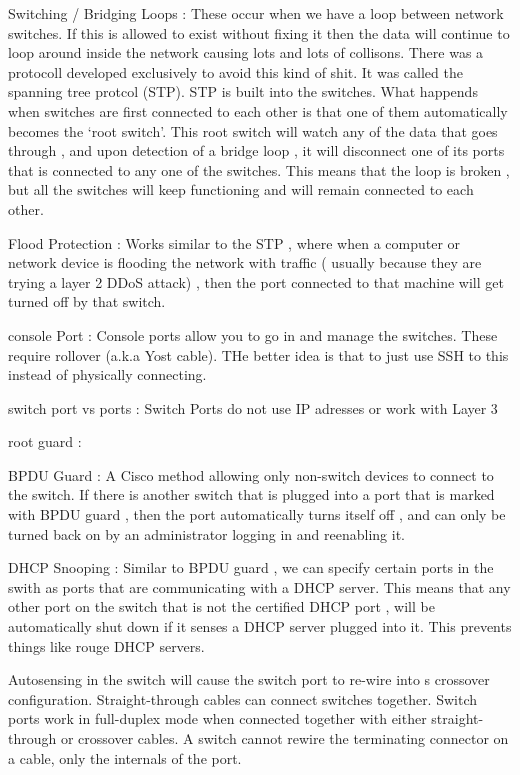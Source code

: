 Switching / Bridging Loops : These occur when we have a loop between network switches.
If this is allowed to exist without fixing it then the data will continue to
loop around inside the network causing lots and lots of collisons. There was a
protocoll developed exclusively to avoid this kind of shit. It was called the
spanning tree protcol (STP). STP is built into the switches. What happends
when switches are first connected to each other is that one of them
automatically becomes the `root switch'. This root switch will watch any of the
data that goes through , and upon detection of a bridge loop , it will
disconnect one of its ports that is connected to any one of the switches. This
means that the loop is broken , but all the switches will keep functioning and
will remain connected to each other.

Flood Protection : Works similar to the STP , where when a computer or network
device is flooding the network with traffic ( usually because they are trying a
layer 2 DDoS attack) , then the port connected to that machine will get turned
off by that switch.

console Port : Console ports allow you to go in and manage the switches. These
require rollover (a.k.a Yost cable). THe better idea is that to just use SSH to
this instead of physically connecting.

switch port vs ports : Switch Ports do not use IP adresses or work with Layer 3

root guard :

BPDU Guard : A Cisco method allowing only non-switch devices to connect to the
switch. If there is another switch that is plugged into a port that is marked
with BPDU guard , then the port automatically turns itself off , and can only be
turned back on by an administrator logging in and reenabling it.


DHCP Snooping : Similar to BPDU guard , we can specify certain ports in the
swith as ports that are communicating with a DHCP server. This means that any
other port on the switch that is not the certified DHCP port , will be
automatically shut down if it senses a DHCP server plugged into it. This
prevents things like rouge DHCP servers.


Autosensing in the switch will cause the switch port to re-wire into s crossover
configuration. Straight-through cables can connect switches together. Switch
ports work in full-duplex mode when connected together with either
straight-through or crossover cables. A switch cannot rewire the terminating
connector on a cable, only the internals of the port.

